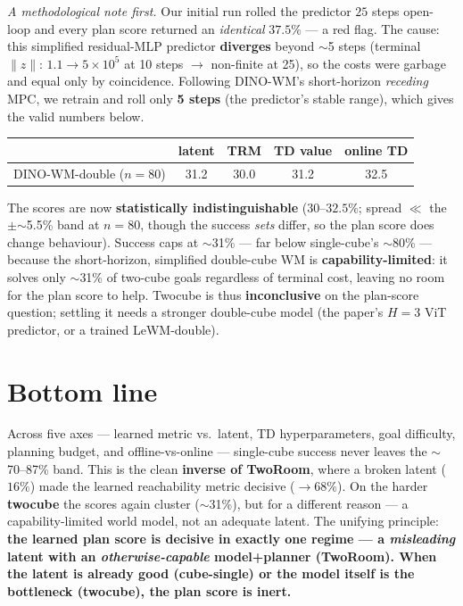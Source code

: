 \documentclass[11pt]{article}
\begin{document}
\emph{A methodological note first.} Our initial run rolled the predictor $25$ steps open-loop and every plan
score returned an \emph{identical} $37.5\%$ --- a red flag. The cause: this simplified residual-MLP predictor
\textbf{diverges} beyond $\sim$5 steps (terminal $\lVert z\rVert$: $1.1 \to 5\!\times\!10^{5}$ at 10 steps
$\to$ non-finite at 25), so the costs were garbage and equal only by coincidence. Following DINO-WM's
short-horizon \emph{receding} MPC, we retrain and roll only \textbf{5 steps} (the predictor's stable range),
which gives the valid numbers below.
\begin{center}\small
\renewcommand{\arraystretch}{1.25}
\begin{tabular}{l cccc}
\toprule
 & latent & TRM & TD value & online TD \\
\midrule
\textsf{DINO-WM-double} ($n{=}80$) & 31.2 & 30.0 & 31.2 & 32.5 \\
\bottomrule
\end{tabular}
\end{center}
The scores are now \textbf{statistically indistinguishable} ($30$--$32.5\%$; spread $\ll$ the $\pm$$\sim$5.5\%
band at $n{=}80$, though the success \emph{sets} differ, so the plan score does change behaviour). Success caps
at $\sim$31\% --- far below single-cube's $\sim$80\% --- because the short-horizon, simplified double-cube WM is
\textbf{capability-limited}: it solves only $\sim$31\% of two-cube goals regardless of terminal cost, leaving no
room for the plan score to help. Twocube is thus \textbf{inconclusive} on the plan-score question; settling it
needs a stronger double-cube model (the paper's $H{=}3$ ViT predictor, or a trained \textsf{LeWM-double}).

\section{Bottom line}
Across five axes --- learned metric vs.\ latent, TD hyperparameters, goal difficulty, planning budget, and
offline-vs-online --- single-cube success never leaves the $\sim$70--87\% band. This is the clean
\textbf{inverse of TwoRoom}, where a broken latent ($16\%$) made the learned reachability metric decisive
($\to$$68\%$). On the harder \textbf{twocube} the scores again cluster ($\sim$31\%), but for a different
reason --- a capability-limited world model, not an adequate latent. The unifying principle: \textbf{the
learned plan score is decisive in exactly one regime --- a \emph{misleading} latent with an
\emph{otherwise-capable} model+planner (TwoRoom). When the latent is already good (cube-single) or the model
itself is the bottleneck (twocube), the plan score is inert.}
\end{document}
